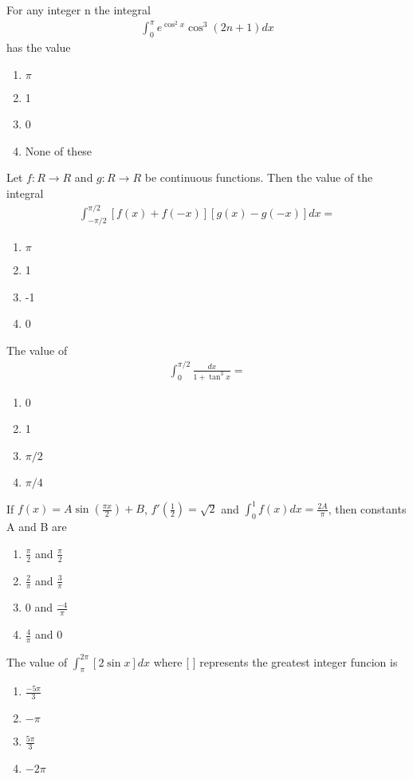 \item For any integer n the integral
\begin{align*}
\int_{0}^{\pi}e^{\cos^{2}x}\cos^{3}(2n + 1)dx
\end{align*}
has the value
\begin{enumerate}
\item $\pi$
\item 1
\item 0
\item None of these
\end{enumerate}

\item Let $f: R \to R$ and $g: R \to R$ be continuous functions. Then the value of the integral
\begin{align*}
\int_{-\pi/2}^{\pi/2}[f(x) + f(-x)][g(x) - g(-x)]dx = 
\end{align*}
\begin{enumerate}
\item $\pi$
\item 1
\item -1
\item 0
\end{enumerate}

\item The value of 
\begin{align*}
\int_{0}^{\pi/2}\frac{dx}{1 + \tan^{3}x} = 
\end{align*}
\begin{enumerate}
\item 0
\item 1
\item $\pi/2$
\item $\pi/4$
\end{enumerate}

\item If $f(x) = A\sin(\frac{\pi x}{2}) + B$, $f'(\frac{1}{2}) = \sqrt{2}$ and $\int_{0}^{1}f(x)dx = \frac{2A}{\pi}$, then constants A and B are
\begin{enumerate}
\item $\frac{\pi}{2}$ and $\frac{\pi}{2}$
\item $\frac{2}{\pi}$ and $\frac{3}{\pi}$
\item 0 and $\frac{-4}{\pi}$
\item $\frac{4}{\pi}$ and 0
\end{enumerate}

\item The value of 
$\int_{\pi}^{2\pi}[2\sin x]dx$
where [ ] represents the greatest integer funcion is
\begin{enumerate}
\item $\frac{-5\pi}{3}$
\item $-\pi$
\item $\frac{5\pi}{3}$
\item $-2\pi$
\end{enumerate}

